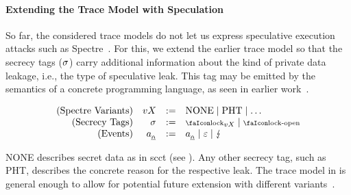 \paragraph{Extending the Trace Model with Speculation}

So far, the considered trace models do not let us express speculative execution attacks such as Spectre~\cite{kocher2019spectre}. 
For this, we extend the earlier trace model so that the secrecy tags ($\sigma_{}{}$) carry additional information about the kind of private data leakage, i.e., the type of speculative leak.
This tag may be emitted by the semantics of a concrete programming language, as seen in earlier work~\cite{fabian2022automatic}. 

\begin{definition}{}
{
\[
  \begin{array}{rrcl}
    (\text{Spectre Variants}) & vX &:=& \operatorname{NONE} \mid \operatorname{PHT} \mid \dots \\
    (\text{Secrecy Tags}) & \varSecuritytag{} &:=& \lock_{vX} \mid \unlock\\ 
    (\text{Events}) & \specEvent &:=& \specEvent \mid \emptyevent \mid \lightning \\ 
  \end{array}
\]
}
\end{definition}

NONE describes secret data as in \gls*{scct} (see ).
Any other secrecy tag, such as PHT, describes the concrete reason for the respective leak.
The trace model in  is general enough to allow for potential future extension with different variants~\cite{kocher2019spectre,maisuradze2018ret2spec,horn2019zero}.

